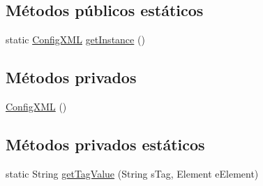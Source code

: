 \subsection*{Métodos públicos estáticos}
\begin{DoxyCompactItemize}
\item 
static \mbox{\hyperlink{classconfiguration_1_1ConfigXML}{Config\+X\+ML}} \mbox{\hyperlink{classconfiguration_1_1ConfigXML_a74c5e0c09c0139554ede8d786cb808ff}{get\+Instance}} ()
\end{DoxyCompactItemize}
\subsection*{Métodos privados}
\begin{DoxyCompactItemize}
\item 
\mbox{\hyperlink{classconfiguration_1_1ConfigXML_a0a848755f002c9c252612e188da0fee0}{Config\+X\+ML}} ()
\end{DoxyCompactItemize}
\subsection*{Métodos privados estáticos}
\begin{DoxyCompactItemize}
\item 
static String \mbox{\hyperlink{classconfiguration_1_1ConfigXML_ae3039f7e5dfe2bfcbb1ab63104b451b2}{get\+Tag\+Value}} (String s\+Tag, Element e\+Element)
\end{DoxyCompactItemize}
